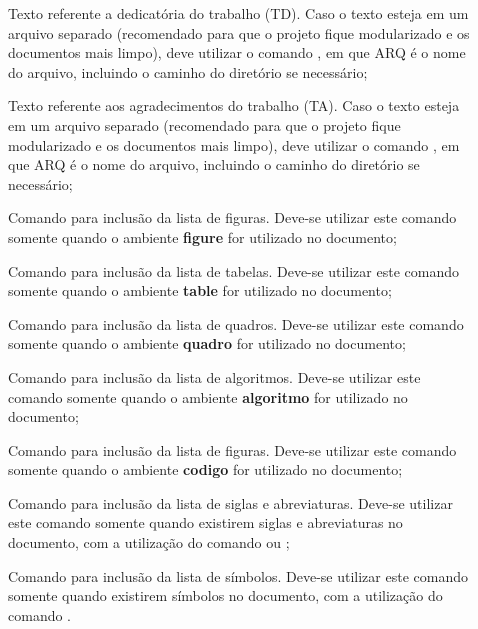 \begin{description}

 \item[] Texto referente a dedicatória do trabalho (TD). Caso o texto esteja em um arquivo separado (recomendado para que o projeto fique modularizado e os documentos mais limpo), deve utilizar o comando , em que ARQ é o nome do arquivo, incluindo o caminho do diretório se necessário;

 \item[] Texto referente aos agradecimentos do trabalho (TA). Caso o texto esteja em um arquivo separado (recomendado para que o projeto fique modularizado e os documentos mais limpo), deve utilizar o comando , em que ARQ é o nome do arquivo, incluindo o caminho do diretório se necessário;

 \item[] Comando para inclusão da lista de figuras. Deve-se utilizar este comando somente quando o ambiente \textbf{figure} for utilizado no documento;
 
 \item[] Comando para inclusão da lista de tabelas. Deve-se utilizar este comando somente quando o ambiente \textbf{table} for utilizado no documento;
  
 \item[] Comando para inclusão da lista de quadros. Deve-se utilizar este comando somente quando o ambiente \textbf{quadro} for utilizado no documento;
   
 \item[] Comando para inclusão da lista de algoritmos. Deve-se utilizar este comando somente quando o ambiente \textbf{algoritmo} for utilizado no documento;
    
 \item[] Comando para inclusão da lista de figuras. Deve-se utilizar este comando somente quando o ambiente \textbf{codigo} for utilizado no documento;
 
 \item[] Comando para inclusão da lista de siglas e abreviaturas. Deve-se utilizar este comando somente quando existirem siglas e abreviaturas no documento, com a utilização do comando  ou ;

 \item[] Comando para inclusão da lista de símbolos. Deve-se utilizar este comando somente quando existirem símbolos no documento, com a utilização do comando .
 
\end{description}